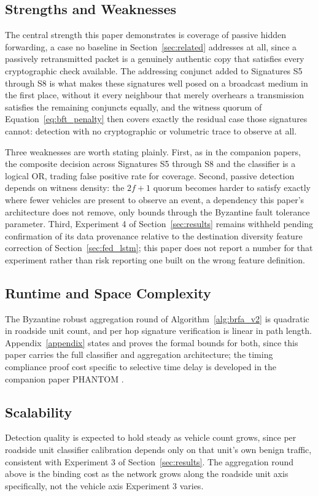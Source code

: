 \documentclass[final,5p,twocolumn]{elsarticle}
\theoremstyle{remark}
\theoremstyle{plain}
\begin{document}
\subsection{Strengths and Weaknesses}
The central strength this paper demonstrates is coverage of passive hidden
forwarding, a case no baseline in Section~\ref{sec:related} addresses at
all, since a passively retransmitted packet is a genuinely authentic copy
that satisfies every cryptographic check available. The addressing
conjunct added to Signatures S5 through S8 is what makes these signatures
well posed on a broadcast medium in the first place, without it every
neighbour that merely overhears a transmission satisfies the remaining
conjuncts equally, and the witness quorum of
Equation~\eqref{eq:bft_penalty} then covers exactly the residual case those
signatures cannot: detection with no cryptographic or volumetric trace to
observe at all.

Three weaknesses are worth stating plainly. First, as in the companion
papers, the composite decision across Signatures S5 through S8 and the
classifier is a logical OR, trading false positive rate for coverage.
Second, passive detection depends on witness density: the $2f{+}1$ quorum
becomes harder to satisfy exactly where fewer vehicles are present to
observe an event, a dependency this paper's architecture does not remove,
only bounds through the Byzantine fault tolerance parameter. Third,
Experiment 4 of Section~\ref{sec:results} remains withheld pending
confirmation of its data provenance relative to the destination diversity
feature correction of Section~\ref{sec:fed_lstm}; this paper does not
report a number for that experiment rather than risk reporting one built on
the wrong feature definition.

\subsection{Runtime and Space Complexity}
The Byzantine robust aggregation round of Algorithm~\ref{alg:brfa_v2} is
quadratic in roadside unit count, and per hop signature verification is
linear in path length. Appendix~\ref{appendix} states and proves the formal
bounds for both, since this paper carries the full classifier and
aggregation architecture; the timing compliance proof cost specific to
selective time delay is developed in the companion paper PHANTOM
\cite{Phantom2026}.

\subsection{Scalability}
Detection quality is expected to hold steady as vehicle count grows, since
per roadside unit classifier calibration depends only on that unit's own
benign traffic, consistent with Experiment 3 of Section~\ref{sec:results}.
The aggregation round above is the binding cost as the network grows along
the roadside unit axis specifically, not the vehicle axis Experiment 3
varies.
\end{document}
